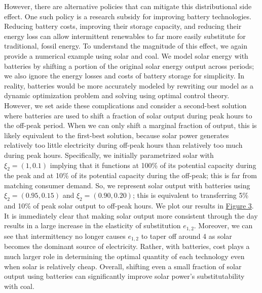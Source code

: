 \documentclass[11pt,a4paper]{extarticle}
\begin{document}
However, there are alternative policies that can mitigate this distributional side effect. One such policy is a research subsidy for improving battery technologies. Reducing battery costs, improving their storage capacity, and reducing their  energy loss can allow intermittent renewables to far more easily substitute for traditional, fossil energy. To understand the magnitude of this effect, we again provide a numerical example using solar and coal. We model solar energy with batteries by shifting a portion of the original solar energy output across periods; we also ignore the energy losses and costs of battery storage for simplicity.  In reality, batteries would be more accurately modeled by rewriting our model as a dynamic optimization problem and solving using optimal control theory. However, we set aside these complications and consider a second-best solution where batteries are used to shift a fraction of solar output during peak hours to the off-peak period. When we can only shift a marginal fraction of output, this is likely equivalent to the first-best solution, because solar power generates relatively too little electricity during off-peak hours than relatively too much during peak hours. Specifically, we initially parametrized solar with $\xi_{2} = (1, 0.1)$ implying that it functions at 100\% of its potential capacity during the peak and at 10\% of its potential capacity during the off-peak; this is far from matching consumer demand. So, we represent solar output with batteries using $\xi_2 = (0.95, 0.15)$ and $\xi_2 = (0.90, 0.20)$; this is equivalent to transferring 5\% and 10\% of peak solar output to off-peak hours.  We plot our results in \hyperref[fig:battery]{Figure 3}. It is immediately clear that making solar output more consistent through the day results in a large increase in the elasticity of substitution $e_{1,2}$. Moreover, we can see that intermittency no longer causes $e_{1,2}$ to taper off around 4 as solar becomes the dominant source of electricity. Rather, with batteries, cost plays a much larger role in determining the optimal quantity of each technology even when solar is relatively cheap. Overall, shifting even a small fraction of solar output using batteries can significantly improve solar power's substitutability with coal. 
\end{document}
